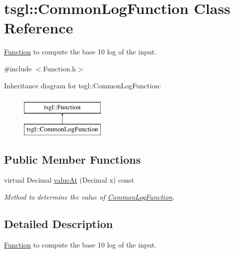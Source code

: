 \hypertarget{classtsgl_1_1_common_log_function}{\section{tsgl\-:\-:\-Common\-Log\-Function \-Class \-Reference}
\label{classtsgl_1_1_common_log_function}
}


\hyperlink{classtsgl_1_1_function}{\-Function} to compute the base 10 log of the input.  




{\ttfamily \#include $<$\-Function.\-h$>$}

\-Inheritance diagram for tsgl\-:\-:\-Common\-Log\-Function\-:\begin{figure}[H]
\begin{center}
\leavevmode
\includegraphics[height=2.000000cm]{classtsgl_1_1_common_log_function}
\end{center}
\end{figure}
\subsection*{\-Public \-Member \-Functions}
\begin{DoxyCompactItemize}
\item 
virtual \-Decimal \hyperlink{classtsgl_1_1_common_log_function_ac320c0f57c0fc4801bf8eb85f07838d8}{value\-At} (\-Decimal x) const 
\begin{DoxyCompactList}\small\item\em \-Method to determine the value of \hyperlink{classtsgl_1_1_common_log_function}{\-Common\-Log\-Function}. \end{DoxyCompactList}\end{DoxyCompactItemize}


\subsection{\-Detailed \-Description}
\hyperlink{classtsgl_1_1_function}{\-Function} to compute the base 10 log of the input. 

